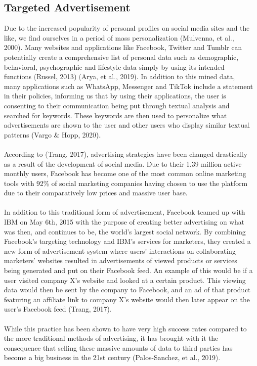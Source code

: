 \documentclass[11pt]{article}
\begin{document}
\subsection{Targeted Advertisement}
Due to the increased popularity of personal profiles on social media sites and the like, we find ourselves in a period of mass personalization (Mulvenna, et al., 2000). Many websites and applications like Facebook, Twitter and Tumblr can potentially create a comprehensive list of personal data such as demographic, behavioral, psychographic and lifestyle-data simply by using its intended functions (Russel, 2013) (Arya, et al., 2019). In addition to this mined data, many applications such as WhatsApp, Messenger and TikTok include a statement in their policies, informing us that by using their applications, the user is consenting to their communication being put through textual analysis and searched for keywords. These keywords are then used to personalize what advertisements are shown to the user and other users who display similar textual patterns (Vargo \& Hopp, 2020). 
\\ \\
According to (Trang, 2017), advertising strategies have been changed drastically as a result of the development of social media. Due to their 1.39 million active monthly users, Facebook has become one of the most common online marketing tools with 92\% of social marketing companies having chosen to use the platform due to their comparatively low prices and massive user base.  
\\ \\
In addition to this traditional form of advertisement, Facebook teamed up with IBM on May 6th, 2015 with the purpose of creating better advertising on what was then, and continues to be, the world’s largest social network. By combining Facebook’s targeting technology and IBM’s services for marketers, they created a new form of advertisement system where users’ interactions on collaborating marketers’ websites resulted in advertisements of viewed products or services being generated and put on their Facebook feed. An example of this would be if a user visited company X’s website and looked at a certain product. This viewing data would then be sent by the company to Facebook, and an ad of that product featuring an affiliate link to company X’s website would then later appear on the user’s Facebook feed (Trang, 2017).  
\\ \\
While this practice has been shown to have very high success rates compared to the more traditional methods of advertising, it has brought with it the consequence that selling these massive amounts of data to third parties has become a big business in the 21st century (Palos-Sanchez, et al., 2019). 
\\ \\
\end{document}
